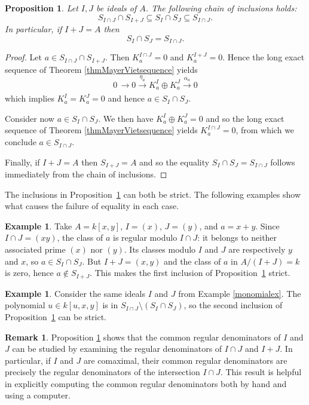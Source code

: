 \documentclass[11pt,leqno]{amsart}
\newcommand{\aar}[2][]{\xrightarrow[#1]{#2}}
\newtheorem{proposition}[theorem]{Proposition}
\theoremstyle{definition}
\newtheorem{remark}[theorem]{Remark}
\newtheorem{example}[theorem]{Example}
\numberwithin{equation}{section}
\begin{document}
\begin{proposition}\label{propchain}
    Let $I,J$ be ideals of $A$. The following chain of inclusions holds:
    $$S_{I\cap J}\cap S_{I+J}
\subseteq S_I\cap S_J
\subseteq S_{I\cap J}.$$
In particular, if $I+J=A$ then 
$$S_{I} \cap S_J=S_{I\cap J}.$$
\end{proposition}
\begin{proof}
    Let $a\in S_{I\cap J} \cap S_{I+J}$. Then $K_a^{I\cap J}=0$ and $K_a^{I+J}=0$. Hence the long exact sequence of Theorem \ref{thmMayerVietsequence} yields 
    $$0\, \aar{} 0 \aar{\eta_a} K_a^I \oplus K_a^J \aar{\alpha_a} 0$$
    which implies $K_a^I=K_a^J=0$ and hence $a\in S_I\cap S_J$. 

    Consider now $a\in S_I\cap S_J$. We then have $K_a^I\oplus K_a^J=0$ and so the long exact sequence of Theorem \ref{thmMayerVietsequence} yields $K_a^{I\cap J}=0$, from which we conclude $a\in S_{I \cap J}$.

    Finally, if $I+J=A$ then $S_{I+J}=A$ and so the equality $S_{I} \cap S_J=S_{I\cap J}$ follows immediately from the chain of inclusions. 
\end{proof}

The inclusions in Proposition~\ref{propchain} can both be strict. The following examples show what causes the failure of equality in each case.

\begin{example}
Take $A=k[x,y]$, $I=(x)$, $J=(y)$, and $a=x+y$. Since $I\cap J=(xy)$, the class of $a$ is regular modulo $I\cap J$: it belongs to neither associated prime $(x)$ nor $(y)$. Its classes modulo $I$ and $J$ are respectively $y$ and $x$, so $a\in S_I\cap S_J$. But $I+J=(x,y)$ and the class of $a$ in $A/(I+J)=k$ is zero, hence $a\notin S_{I+J}$. This makes the first inclusion of Proposition~\ref{propchain} strict.
\end{example}

\begin{example}
Consider the same ideals $I$ and $J$ from Example \ref{monomialex}. The polynomial $u\in k[u,x,y]$ is in $S_{I\cap J}\setminus(S_I\cap S_J)$, so the second inclusion of Proposition~\ref{propchain} can be strict.
\end{example}

\begin{remark}
    Proposition \ref{propchain} shows that the common regular denominators of $I$ and $J$ can be studied by examining the regular denominators of $I\cap J$ and $I+J$. In particular, if $I$ and $J$ are comaximal, their common regular denominators are precisely the regular denominators of the intersection $I\cap J$. This result is helpful in explicitly computing the common regular denominators both by hand and using a computer. 
\end{remark}
\end{document}
